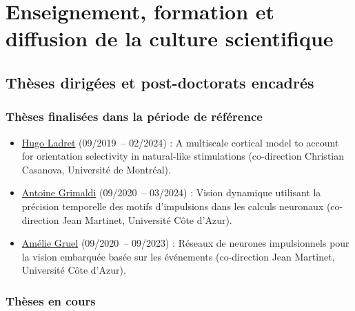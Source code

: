 \documentclass[11pt,french,a4paper,oneside]{article}
\begin{document}
\section{Enseignement, formation et diffusion de la culture scientifique}

\subsection{Thèses dirigées et post-doctorats encadrés}

\subsubsection*{Thèses finalisées dans la période de référence}

\begin{itemize}
    \item \href{https://laurentperrinet.github.io/author/hugo-ladret/}{Hugo Ladret} (09/2019~-- 02/2024) : \og A multiscale cortical model to account for orientation selectivity in natural-like stimulations \fg{} (co-direction Christian Casanova, Université de Montréal).
    \item \href{https://laurentperrinet.github.io/author/antoine-grimaldi/}{Antoine Grimaldi} (09/2020~-- 03/2024) : \og Vision dynamique utilisant la précision temporelle des motifs d'impulsions dans les calculs neuronaux \fg{} (co-direction Jean Martinet, Université Côte d'Azur).
    \item \href{https://laurentperrinet.github.io/author/amelie-gruel/}{Amélie Gruel} (09/2020~-- 09/2023) : \og Réseaux de neurones impulsionnels pour la vision embarquée basée sur les événements \fg{} (co-direction Jean Martinet, Université Côte d'Azur).
\end{itemize}

\subsubsection*{Thèses en cours}
\end{document}
